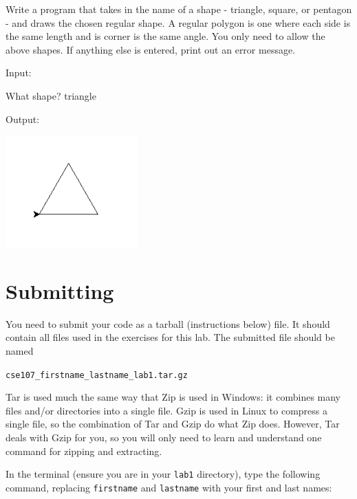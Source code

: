 \documentclass[11pt]{cselabheader}
\begin{document}
  \begin{ex}[polygons.py] Write a program that takes in the name of a shape -
  	triangle, square, or pentagon - and draws the chosen regular shape. A regular
  	polygon is one where each side is the same length and is corner is the same
  	angle. You only need to allow the above shapes. If anything else is entered,
  	print out an error message.

    Input:

    \begin{verbatimcode}
What shape? triangle
    \end{verbatimcode}

    Output:
    \begin{center}
      \includegraphics[width=2.0in]{img/triangle}
    \end{center}
\end{ex}


\pagebreak
\section{Submitting}

You need to submit your code as a tarball (instructions below)
file. It should contain all files used in the exercises for this lab.
The submitted file should be named
\begin{center}
\texttt{cse107\_firstname\_lastname\_lab1.tar.gz}
\end{center}

Tar is used much the same way that Zip is used in Windows: it combines many
files and/or directories into a single file. Gzip is used in Linux to compress a
single file, so the combination of Tar and Gzip do what Zip does. However, Tar
deals with Gzip for you, so you will only need to learn and understand one
command for zipping and extracting.

In the terminal (ensure you are in your \texttt{lab1} directory), type the
following command, replacing \texttt{firstname} and \texttt{lastname} with your
first and last names:
\end{document}

